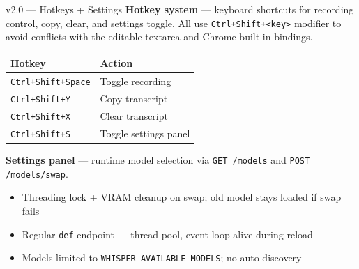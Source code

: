 \documentclass{beamer}
\begin{document}
\begin{frame}{v2.0 --- Hotkeys + Settings}
    \small
    \textbf{Hotkey system} --- keyboard shortcuts for recording control,
    copy, clear, and settings toggle. All use \texttt{Ctrl+Shift+<key>}
    modifier to avoid conflicts with the editable textarea and Chrome
    built-in bindings.

    \vspace{0.3em}
    \begin{table}
    \centering\small
    \begin{tabular}{@{} l l @{}}
        \toprule
        \textbf{Hotkey} & \textbf{Action} \\
        \midrule
        \texttt{Ctrl+Shift+Space} & Toggle recording \\
        \texttt{Ctrl+Shift+Y}     & Copy transcript \\
        \texttt{Ctrl+Shift+X}     & Clear transcript \\
        \texttt{Ctrl+Shift+S}     & Toggle settings panel \\
        \bottomrule
    \end{tabular}
    \end{table}

    \vspace{0.2em}
    \textbf{Settings panel} --- runtime model selection via
    \texttt{GET /models} and \texttt{POST /models/swap}.
    \begin{itemize}\setlength{\itemsep}{0pt}\setlength{\parskip}{0pt}
        \item Threading lock + VRAM cleanup on swap;
              old model stays loaded if swap fails
        \item Regular \texttt{def} endpoint --- thread pool,
              event loop alive during reload
        \item Models limited to \texttt{WHISPER\_AVAILABLE\_MODELS};
              no auto-discovery
    \end{itemize}
\end{frame}
\end{document}
